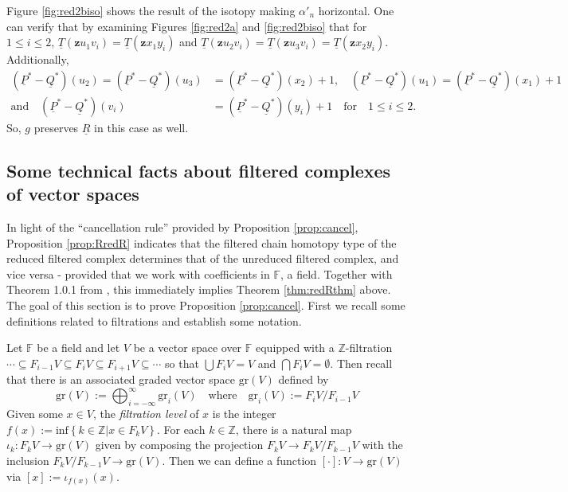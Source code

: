 \documentclass[11pt]{article}
\theoremstyle{plain} \newtheorem{thm}{Theorem}[subsection]
\theoremstyle{plain} \newtheorem{cor}[thm]{Corollary}
\theoremstyle{plain} \newtheorem{prop}[thm]{Proposition}
\theoremstyle{plain} \newtheorem{conj}[thm]{Conjecture}
\theoremstyle{plain} \newtheorem{lem}[thm]{Lemma}
\theoremstyle{definition} \newtheorem{df}[thm]{Definition}
\theoremstyle{remark} \newtheorem{rmk}[thm]{Remark}
\theoremstyle{remark} \newtheorem{obs}[thm]{Observation}
\newcommand{\red}[1]{\underline{#1}}
\newcommand{\bz}{\mathbf{z}}
\numberwithin{equation}{section}
\begin{document}
Figure \ref{fig:red2biso} shows the result of the isotopy making $\alpha'_{n}$ horizontal.  One can verify that by examining Figures \ref{fig:red2a} and \ref{fig:red2biso} that for $1 \leq i \leq 2$, $\red{T}( \bz u_{1} v_{i}) = \red{T}( \bz x_{1} y_{i})$ and $\red{T}( \bz u_{2} v_{i}) = \red{T}( \bz u_{3} v_{i})  = \red{T}( \bz x_{2} y_{i})$.  Additionally,
\begin{align*}
\left(\red{P}^{*} - \red{Q}^{*}\right)(u_{2}) = \left(\red{P}^{*} - \red{Q}^{*}\right)(u_{3}) &= \left(\red{P}^{*} - \red{Q}^{*}\right)(x_{2}) + 1,
\quad\left(\red{P}^{*} - \red{Q}^{*}\right)(u_{1}) = \left(\red{P}^{*} - \red{Q}^{*}\right)(x_{1}) + 1\\
\text{and} \quad \left(\red{P}^{*} - \red{Q}^{*}\right)(v_{i}) &= \left(\red{P}^{*} - \red{Q}^{*}\right)(y_{i}) + 1\quad \text{for} \quad 1 \leq i \leq 2.
\end{align*}
So, $g$ preserves $\red{R}$ in this case as well.

\subsection{Some technical facts about filtered complexes of vector spaces}\label{sec:cancel}

In light of the ``cancellation rule'' provided by Proposition \ref{prop:cancel}, Proposition \ref{prop:RredR} indicates that the filtered chain homotopy type of the reduced filtered complex determines that of the unreduced filtered complex, and vice versa - provided that we work with coefficients in $\mathbb{F}$, a field.   Together with Theorem 1.0.1 from \cite{et:R}, this immediately implies Theorem \ref{thm:redRthm} above.  The goal of this section is to prove Proposition \ref{prop:cancel}.  First we recall some definitions related to filtrations and establish some notation.

Let $\mathbb{F}$ be a field and let $V$ be a vector space over $\mathbb{F}$ equipped with a $\mathbb{Z}$-filtration $\cdots \subseteq F_{i-1}V \subseteq F_{i}V \subseteq F_{i+1}V \subseteq \cdots$ so that $\bigcup F_{i}V = V$ and $\bigcap F_{i}V = \emptyset$.  Then recall that there is an associated graded vector space $\text{gr}(V)$ defined by
$$ \text{gr}(V) := \bigoplus_{i = -\infty}^{\infty} \text{gr}_i(V) \quad \text{where} \quad
\text{gr}_i(V) :=F_{i}V / F_{i-1}V$$
Given some $x \in V$, the \emph{filtration level} of $x$ is the integer $f(x) := \text{inf} \left\{ k \in \mathbb{Z} \big| x \in F_{k}V  \right\}$.  For each $k \in \mathbb{Z}$, there is a natural map $\iota_k:F_{k}V \rightarrow \text{gr}(V)$ given by composing the projection $F_{k}V \rightarrow F_{k}V/F_{k-1}V$ with the inclusion $F_{k}V / F_{k-1}V \rightarrow \text{gr}(V)$.  Then we can define a function $[\cdot]:V \rightarrow \text{gr}(V)$ via $[x]:=\iota_{f(x)} (x)$.
\end{document}
